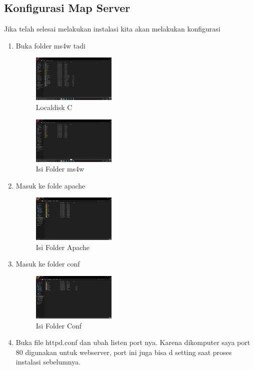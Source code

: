 \subsection{Konfigurasi Map Server}
Jika telah selesai melakukan instalasi kita akan melakukan konfigurasi
\begin{enumerate}
  \item Buka folder ms4w tadi
  \hfill\break
    \begin{figure}[H]
		\includegraphics[width=4cm]{figures/1174031/4/5.png}
		\centering
		\caption{Localdisk C}
    \end{figure}
    \hfill\break
    \begin{figure}[H]
		\includegraphics[width=4cm]{figures/1174031/4/6.png}
		\centering
		\caption{Isi Folder ms4w}
    \end{figure}
  \item Masuk ke folde apache
  \hfill\break
    \begin{figure}[H]
		\includegraphics[width=4cm]{figures/1174031/4/7.png}
		\centering
		\caption{Isi Folder Apache}
    \end{figure}
  \item Masuk ke folder conf
  \hfill\break
    \begin{figure}[H]
		\includegraphics[width=4cm]{figures/1174031/4/8.png}
		\centering
		\caption{Isi Folder Conf}
    \end{figure}
  \item Buka file httpd.conf dan ubah listen port nya. Karena dikomputer saya port 80 digunakan untuk webserver, port ini juga bisa d setting saat proses instalasi sebelumnya.

\end{enumerate}
